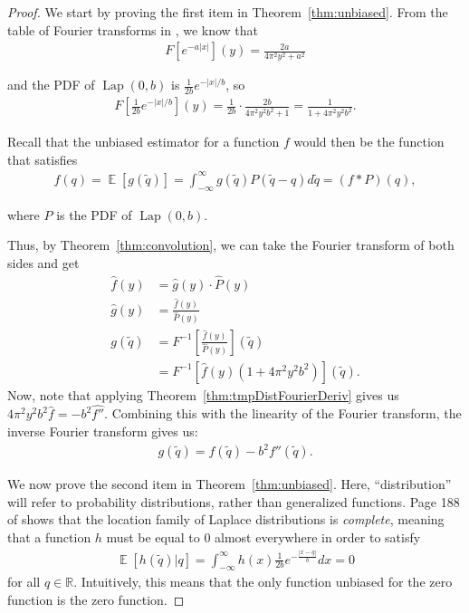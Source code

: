 \documentclass[11pt]{article}
\newcommand{\E}{\operatorname{\mathbb{E}}}
\newcommand{\Lap}{\operatorname{Lap}}
\newcommand{\R}{\mathbb{R}}
\begin{document}
\begin{proof}
    We start by proving the first item in Theorem~\ref{thm:unbiased}. From the table of Fourier transforms in \cite{Kammler_2008}, we know that
\begin{align}
    F\left[e^{-a|x|}\right](y) = \frac{2a}{4\pi^2 y^2 + a^2}
\end{align}

and the PDF of $\Lap(0,b)$ is $\frac{1}{2b}e^{-|x|/b}$, so
\begin{align}
    F\left[\frac{1}{2b} e^{-|x|/b}\right](y) = \frac{1}{2b} \cdot \frac{2b}{4\pi^2 y^2 b^2 + 1} = \frac{1}{1+ 4\pi^2 y^2 b^2}.
\end{align}

Recall that the unbiased estimator for a function $f$ would then be the function that satisfies
\begin{align}
    f(q) = \E[g(\tilde{q})] = \int_{-\infty}^\infty g(\tilde{q}) P(\tilde{q} - q) d\tilde{q} = (f * P)(q),
\end{align}

where $P$ is the PDF of $\Lap(0,b)$.

Thus, by Theorem~\ref{thm:convolution}, we can take the Fourier transform of both sides and get
\begin{align}\hat{f}(y) &= \hat{g}(y) \cdot \hat{P}(y)\\
\hat{g}(y) &= \frac{\hat{f}(y)}{\hat{P}(y)}\\
g(\tilde{q}) &= F^{-1} \left[\frac{\hat{f}(y)}{\hat{P}(y)}\right](\tilde{q})\\
&= F^{-1} \left[\hat{f}(y)(1+4\pi^2y^2b^2)\right](\tilde{q}).
\end{align}
Now, note that applying Theorem~\ref{thm:tmpDistFourierDeriv} gives us $4\pi^2y^2b^2\hat{f} = -b^2\widehat{f''}$. Combining this with the linearity of the Fourier transform, the inverse Fourier transform gives us:
\begin{align}
    g(\tilde{q}) = f(\tilde{q}) - b^2 f''(\tilde{q}).
\end{align}

We now prove the second item in Theorem~\ref{thm:unbiased}. Here, ``distribution'' will refer to probability distributions, rather than generalized functions. Page 188 of \cite{OosterhoffEtAl1987Complete} shows that the location family of Laplace distributions is \textit{complete}, meaning that a function $h$ must be equal to 0 almost everywhere in order to satisfy 
\begin{align}
    \E[h(\tilde{q})|q] = \int_{-\infty}^{\infty} h(x) \frac{1}{2b}e^{-\frac{|x-q|}{b}} dx = 0
\end{align}
for all $q \in \R$. Intuitively, this means that the only function unbiased for the zero function is the zero function.


\end{proof}
\end{document}

